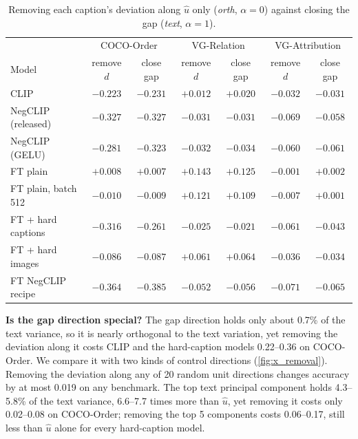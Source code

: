 \documentclass{article}
\newcommand{\uhat}{\hat{u}}
\begin{document}
\begin{table}[t]
\caption{Removing each caption's deviation along $\uhat$ only (\emph{orth}, $\alpha=0$) against closing the gap (\emph{text}, $\alpha=1$).}
\label{tab:mechanism}
\begin{center}
\begin{small}
\begin{tabular}{lcccccc}
\toprule
& \multicolumn{2}{c}{COCO-Order} & \multicolumn{2}{c}{VG-Relation} & \multicolumn{2}{c}{VG-Attribution} \\
Model & remove $d$ & close gap & remove $d$ & close gap & remove $d$ & close gap \\
\midrule
CLIP & $-0.223$ & $-0.231$ & $+0.012$ & $+0.020$ & $-0.032$ & $-0.031$ \\
NegCLIP (released) & $-0.327$ & $-0.327$ & $-0.031$ & $-0.031$ & $-0.069$ & $-0.058$ \\
NegCLIP (GELU) & $-0.281$ & $-0.323$ & $-0.032$ & $-0.034$ & $-0.060$ & $-0.061$ \\
FT plain & $+0.008$ & $+0.007$ & $+0.143$ & $+0.125$ & $-0.001$ & $+0.002$ \\
FT plain, batch 512 & $-0.010$ & $-0.009$ & $+0.121$ & $+0.109$ & $-0.007$ & $+0.001$ \\
FT + hard captions & $-0.316$ & $-0.261$ & $-0.025$ & $-0.021$ & $-0.061$ & $-0.043$ \\
FT + hard images & $-0.086$ & $-0.087$ & $+0.061$ & $+0.064$ & $-0.036$ & $-0.034$ \\
FT NegCLIP recipe & $-0.364$ & $-0.385$ & $-0.052$ & $-0.056$ & $-0.071$ & $-0.065$ \\
\bottomrule
\end{tabular}
\end{small}
\end{center}
\end{table}

\textbf{Is the gap direction special?}
The gap direction holds only about 0.7\% of the text variance, so it is nearly orthogonal to the text variation, yet removing the deviation along it costs CLIP and the hard-caption models 0.22--0.36 on COCO-Order. We compare it with two kinds of control directions (\cref{fig:x_removal}). Removing the deviation along any of 20 random unit directions changes accuracy by at most 0.019 on any benchmark. The top text principal component holds 4.3--5.8\% of the text variance, 6.6--7.7 times more than $\uhat$, yet removing it costs only 0.02--0.08 on COCO-Order; removing the top 5 components costs 0.06--0.17, still less than $\uhat$ alone for every hard-caption model.
\end{document}
